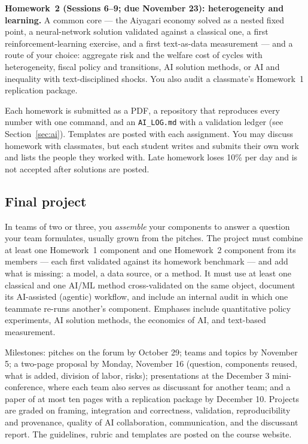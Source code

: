 \documentclass[11pt]{article}
\begin{document}
\textbf{Homework~2 (Sessions 6--9; due November 23): heterogeneity and learning.} A common core --- the Aiyagari economy solved as a nested fixed point, a neural-network solution validated against a classical one, a first reinforcement-learning exercise, and a first text-as-data measurement --- and a route of your choice: aggregate risk and the welfare cost of cycles with heterogeneity, fiscal policy and transitions, AI solution methods, or AI and inequality with text-disciplined shocks. You also audit a classmate's Homework~1 replication package.

Each homework is submitted as a PDF, a repository that reproduces every number with one command, and an \texttt{AI\_LOG.md} with a validation ledger (see Section~\ref{sec:ai}). Templates are posted with each assignment. You may discuss homework with classmates, but each student writes and submits their own work and lists the people they worked with. Late homework loses 10\% per day and is not accepted after solutions are posted.

\subsection{Final project}
In teams of two or three, you \emph{assemble} your components to answer a question your team formulates, usually grown from the pitches. The project must combine at least one Homework~1 component and one Homework~2 component from its members --- each first validated against its homework benchmark --- and add what is missing: a model, a data source, or a method. It must use at least one classical and one AI/ML method cross-validated on the same object, document its AI-assisted (agentic) workflow, and include an internal audit in which one teammate re-runs another's component. Emphases include quantitative policy experiments, AI solution methods, the economics of AI, and text-based measurement.

Milestones: pitches on the forum by October 29; teams and topics by November 5; a two-page proposal by Monday, November 16 (question, components reused, what is added, division of labor, risks); presentations at the December 3 mini-conference, where each team also serves as discussant for another team; and a paper of at most ten pages with a replication package by December 10. Projects are graded on framing, integration and correctness, validation, reproducibility and provenance, quality of AI collaboration, communication, and the discussant report. The guidelines, rubric and templates are posted on the course website.
\end{document}
